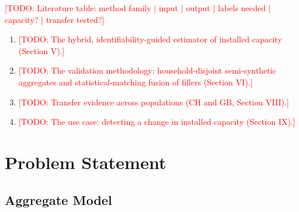 \documentclass[9pt,journal,a4paper]{IEEEtran}
\newcommand{\todo}[1]{\textcolor{red}{[TODO: #1]}}
\begin{document}

\todo{Literature table: method family | input | output | labels needed | capacity? | transfer tested?}


\begin{enumerate}
\item \todo{The hybrid, identifiability-guided estimator of installed capacity (Section V).}
\item \todo{The validation methodology: household-disjoint semi-synthetic aggregates and statistical-matching fusion of fillers (Section VI).}
\item \todo{Transfer evidence across populations (CH and GB, Section VIII).}
\item \todo{The use case: detecting a change in installed capacity (Section IX).}
\end{enumerate}


\section{Problem Statement}
\label{sec:problem}

\subsection{Aggregate Model}
\end{document}
